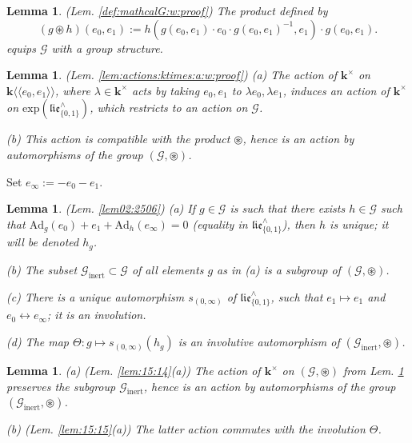 \documentclass[10pt]{amsart}
\newtheorem{lem}[thm]{Lemma}
\numberwithin{equation}{subsection}
\begin{document}
\begin{lem}\label{def:mathcalG} (Lem. \ref{def:mathcalG:w:proof}) 
The product defined by 
$$
(g\circledast h)(e_0,e_1):=h(g(e_0,e_1)\cdot e_0\cdot g(e_0,e_1)^{-1},e_1)\cdot g(e_0,e_1). 
$$
equips $\mathcal G$ with a group structure. 
\end{lem}

\begin{lem}\label{lem:actions:ktimes:a} (Lem. \ref{lem:actions:ktimes:a:w:proof})
(a)   The action of $\mathbf k^\times$ on $\mathbf k\langle\langle e_0,e_1\rangle\rangle$,
where $\lambda\in\mathbf k^\times$ acts by taking $e_0,e_1$ to $\lambda e_0,\lambda e_1$, 
induces an action of $\mathbf k^\times$ on $\mathrm{exp}(\mathfrak{lie}_{\{0,1\}}^\wedge)$, 
which restricts to an action on $\mathcal G$. 

(b) This action is compatible with the product $\circledast$, hence is an action by 
automorphisms of the group $(\mathcal G,\circledast)$. 
\end{lem}

Set $e_\infty:=-e_0-e_1$. 
\begin{lem}\label{lem02:2506:wo:proof} (Lem. \ref{lem02:2506})
    (a) If $g\in \mathcal G$ is such that there exists $h\in \mathcal G$ such that 
$\mathrm{Ad}_g(e_0)+e_1+\mathrm{Ad}_h(e_\infty)=0$ (equality in $\mathfrak{lie}_{\{0,1\}}^\wedge$), then 
$h$ is unique; it will be denoted $h_g$. 

(b) The subset $\mathcal G_{\mathrm{inert}}\subset  \mathcal G$ of all elements 
$g$ as in (a) is a subgroup of 
$(\mathcal G,\circledast)$.

(c) There is a unique automorphism $s_{(0,\infty)}$ of 
$\mathfrak{lie}_{\{0,1\}}^\wedge$, such that 
$e_1\mapsto e_1$ and $e_0\leftrightarrow e_\infty$; it is an involution. 

(d) The map $\Theta : g\mapsto s_{(0,\infty)}(h_g)$ is an involutive automorphism of $(\mathcal G_{\mathrm{inert}},\circledast)$.
\end{lem}

\begin{lem}\label{lem:actions:ktimes:b}
 (a) (Lem. \ref{lem:15:14}(a))
 The action of $\mathbf k^\times$ on $(\mathcal G,\circledast)$ from Lem. \ref{lem:actions:ktimes:a}
 preserves the subgroup $\mathcal G_{\mathrm{inert}}$, hence is an action by automorphisms of the 
 group $(\mathcal G_{\mathrm{inert}},\circledast)$. 

(b) (Lem. \ref{lem:15:15}(a))
The latter action commutes with the involution $\Theta$.     
\end{lem}
\end{document}
